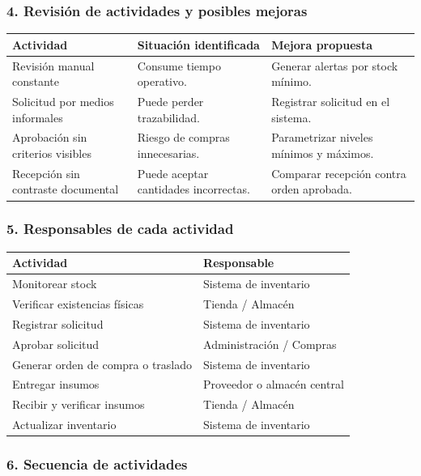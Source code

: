\documentclass[a4paper,12pt]{article}
\begin{document}
\subsubsection*{4. Revisión de actividades y posibles mejoras}

\begin{longtable}{P{5cm} P{4cm} P{5cm}}
\toprule
\textbf{Actividad} & \textbf{Situación identificada} & \textbf{Mejora propuesta} \\
\midrule
Revisión manual constante & Consume tiempo operativo. & Generar alertas por stock mínimo. \\
Solicitud por medios informales & Puede perder trazabilidad. & Registrar solicitud en el sistema. \\
Aprobación sin criterios visibles & Riesgo de compras innecesarias. & Parametrizar niveles mínimos y máximos. \\
Recepción sin contraste documental & Puede aceptar cantidades incorrectas. & Comparar recepción contra orden aprobada. \\
\bottomrule
\end{longtable}

\subsubsection*{5. Responsables de cada actividad}

\begin{longtable}{P{7cm} P{7cm}}
\toprule
\textbf{Actividad} & \textbf{Responsable} \\
\midrule
Monitorear stock & Sistema de inventario \\
Verificar existencias físicas & Tienda / Almacén \\
Registrar solicitud & Sistema de inventario \\
Aprobar solicitud & Administración / Compras \\
Generar orden de compra o traslado & Sistema de inventario \\
Entregar insumos & Proveedor o almacén central \\
Recibir y verificar insumos & Tienda / Almacén \\
Actualizar inventario & Sistema de inventario \\
\bottomrule
\end{longtable}

\subsubsection*{6. Secuencia de actividades}
\end{document}
